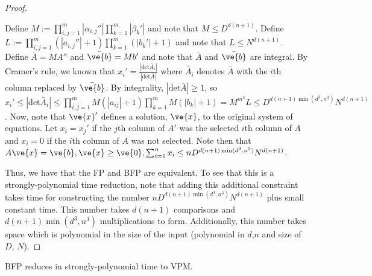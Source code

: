\begin{proof}
\begin{claimproof}
Define $M:= \prod_{i,j=1}^m |\alpha_{i,j}''| \prod_{k=1}^m |\beta_{k}'|$ and note that $M \le D^{d(n+1)}$.  
Define $L := \prod_{i,j=1}^m (|a_{i,j}''|+1) \prod_{k=1}^m (|b_{k}'|+1)$ and note that $L \le N^{d(n+1)}$.  
Define $\bar{A} = MA''$ and $\bar{\ve{b}} = Mb'$ and note that $\bar{A}$ and $\bar{\ve{b}}$ are integral.  By Cramer's rule, we known that $x_i' = \frac{|\text{det} \bar{A}_i|}{|\text{det} \bar{A}|}$ where $\bar{A}_i$ denotes $\bar{A}$ with the $i$th column replaced by $\bar{\ve{b}}$.  By integrality, $|\text{det} \bar{A}| \ge 1$, so $x_i' \le |\text{det} \bar{A}_i| \le \prod_{i,j=1}^m M (|a_{ij}|+1) \prod_{k=1}^m M (|b_k|+1) = M^{m^3}L \le D^{d(n+1)\min(d^3,n^3)}N^{d(n+1)}$.  Now, note that $\ve{x}'$ defines a solution, $\ve{x}$, to the original system of equations.  Let $x_i = x_j'$ if the $j$th column of $A'$ was the selected $i$th column of $A$  and $x_i=0$ if the $i$th column of $A$ was not selected.  Note then that $A \ve{x} = \ve{b}, \ve{x} \ge \ve{0}, \sum_{i=1}^n x_i \le n D^{d(n+1)\min(d^3,n^3)}N^{d(n+1)}$.
\end{claimproof}

Thus, we have that the FP and BFP are equivalent.  To see that this is a strongly-polynomial time reduction, note that adding this additional constraint takes time for constructing the number $n D^{d(n+1)\min(d^3,n^3)}N^{d(n+1)}$ plus small constant time.  This number takes $d(n+1)$ comparisons and $d(n+1)\min(d^3,n^3)$ multiplications to form.  Additionally, this number takes space which is polynomial in the size of the input (polynomial in $d$,$n$ and size of $D$, $N$).  
\end{proof}

\begin{lemma} BFP reduces in strongly-polynomial time to VPM.
\end{lemma}

